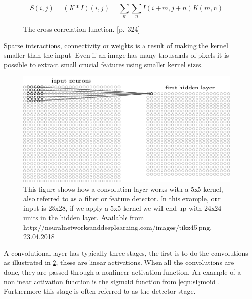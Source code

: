 \begin{figure}[H]
    \begin{equation}
        S(i,j) = (K*I)(i,j) = \sum_{m} \sum_{n} I(i+m,j+n)K(m,n)
    \end{equation}
    \label{fig:cross_corr}
    \caption{The cross-correlation function. \cite{goodfellow_deep_2016}[p.~324]}
\end{figure}

Sparse interactions, connectivity or weights is a result of making the kernel smaller than the input. Even if an image has many thousands of pixels it is possible to extract small crucial features using smaller kernel sizes.

\begin{figure}[H]
    \centering
    \includegraphics[width=\textwidth]{Assets/Chapter2_Theory/kernel_applied.png}
    \caption{\cite{nielsen_neural_2015} This figure shows how a convolution layer works with a 5x5 kernel, also referred to as a filter or feature detector. In this example, our input is 28x28, if we apply a 5x5 kernel we will end up with 24x24 units in the hidden layer. Available from http://neuralnetworksanddeeplearning.com/images/tikz45.png, 23.04.2018}
    \label{fig:kernel_applied}
\end{figure}

A convolutional layer has typically three stages, the first is to do the convolutions as illustrated in \ref{fig:kernel_applied}, these are linear activations. When all the convolutions are done, they are passed through a nonlinear activation function. An example of a \gls{nonlinear} activation function is the sigmoid function from \ref{eqn:sigmoid}. Furthermore this stage is often referred to as the detector stage.

